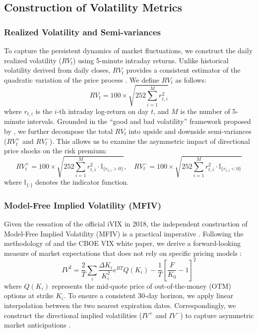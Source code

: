 \documentclass[a4paper, 12pt]{article}    %
\begin{document}
\subsection{Construction of Volatility Metrics}

\subsubsection{Realized Volatility and Semi-variances}
To capture the persistent dynamics of market fluctuations, we construct the daily realized volatility ($RV_t$) using 5-minute intraday returns. Unlike historical volatility derived from daily closes, $RV_t$ provides a consistent estimator of the quadratic variation of the price process {\citep{andersen1998}}. We define $RV_t$ as follows:
\begin{equation}
RV_t = 100 \times \sqrt{252 \sum_{i=1}^{M} r_{t,i}^2}
\end{equation}
where $r_{t,i}$ is the $i$-th intraday log-return on day $t$, and $M$ is the number of 5-minute intervals. Grounded in the ``good and bad volatility'' framework proposed by {\cite{bollerslev2014}}, we further decompose the total $RV_t$ into upside and downside semi-variances ($RV^+_t$ and $RV^-_t$). This allows us to examine the asymmetric impact of directional price shocks on the risk premium:
\begin{equation}
RV^+_t = 100 \times \sqrt{252 \sum_{i=1}^{M} r_{t,i}^2 \cdot \mathbb{I}_{\{r_{t,i} > 0\}}}, \quad RV^-_t = 100 \times \sqrt{252 \sum_{i=1}^{M} r_{t,i}^2 \cdot \mathbb{I}_{\{r_{t,i} < 0\}}}
\end{equation}
where $\mathbb{I}_{\{\cdot\}}$ denotes the indicator function.

\subsubsection{Model-Free Implied Volatility (MFIV)}
Given the cessation of the official iVIX in 2018, the independent construction of Model-Free Implied Volatility (MFIV) is a practical imperative {\citep{huang2016modelfree}}. Following the methodology of {\cite{brittenjones2000}} and the CBOE VIX white paper, we derive a forward-looking measure of market expectations that does not rely on specific pricing models {\citep{carr2007variance}}:
\begin{equation}
IV^2 = \frac{2}{T} \sum_i \frac{\Delta K_i}{K_i^2} e^{RT} Q(K_i) - \frac{1}{T} \left[ \frac{F}{K_0} - 1 \right]^2
\end{equation}
where $Q(K_i)$ represents the mid-quote price of out-of-the-money (OTM) options at strike $K_i$. To ensure a consistent 30-day horizon, we apply linear interpolation between the two nearest expiration dates. Correspondingly, we construct the directional implied volatilities ($IV^+$ and $IV^-$) to capture asymmetric market anticipations {\citep{bollerslev2009}}.
\end{document}
